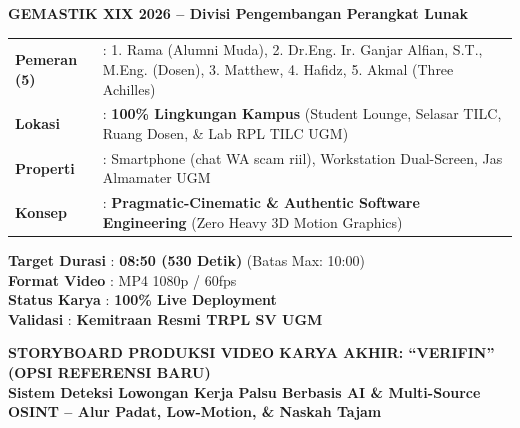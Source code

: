 \documentclass[a4paper,landscape,10pt]{article}
\begin{document}
\noindent
\begin{minipage}[t]{0.68\textwidth}
{\large \textbf{GEMASTIK XIX 2026 -- Divisi Pengembangan Perangkat Lunak}} \\[0.15cm]
\small
\begin{tabular}{@{}lp{14.2cm}@{}}
\textbf{Pemeran (5)} & : 1. Rama (Alumni Muda), 2. Dr.Eng. Ir. Ganjar Alfian, S.T., M.Eng. (Dosen), 3. Matthew, 4. Hafidz, 5. Akmal (Three Achilles) \\
\textbf{Lokasi} & : \textbf{100\% Lingkungan Kampus} (Student Lounge, Selasar TILC, Ruang Dosen, \& Lab RPL TILC UGM) \\
\textbf{Properti} & : Smartphone (chat WA scam riil), Workstation Dual-Screen, Jas Almamater UGM \\
\textbf{Konsep} & : \textbf{Pragmatic-Cinematic \& Authentic Software Engineering} (Zero Heavy 3D Motion Graphics) \\
\end{tabular}
\end{minipage}
\hfill
\begin{minipage}[t]{0.30\textwidth}
\raggedleft
\small
\textbf{Target Durasi} : \textbf{08:50 (530 Detik)} (Batas Max: 10:00) \\
\textbf{Format Video} : MP4 1080p / 60fps \\
\textbf{Status Karya} : \textbf{\textcolor{green!50!black}{100\% Live Deployment}} \\
\textbf{Validasi} : \textbf{\textcolor{blue!70!black}{Kemitraan Resmi TRPL SV UGM}} \\
\end{minipage}

\vspace{0.25cm}
\begin{center}
{\Large \textbf{STORYBOARD PRODUKSI VIDEO KARYA AKHIR: ``VERIFIN'' (OPSI REFERENSI BARU)}} \\
\vspace{0.08cm}
{\small \textbf{Sistem Deteksi Lowongan Kerja Palsu Berbasis AI \& Multi-Source OSINT -- Alur Padat, Low-Motion, \& Naskah Tajam}}
\end{center}
\vspace{0.15cm}
\end{document}
